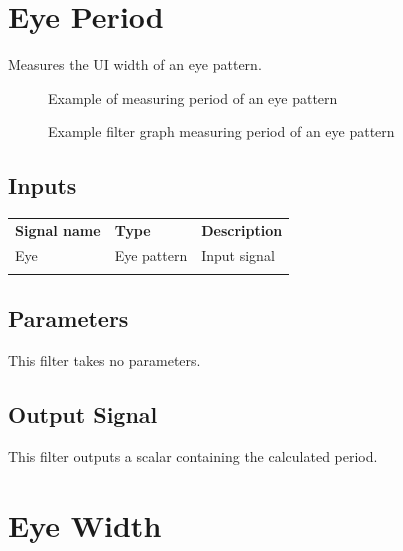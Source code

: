 \pagebreak
\section{Eye Period}
\label{filter:eyeperiod}

Measures the UI width of an eye pattern.

\begin{figure}[h]
\centering
{}
\caption{Example of measuring period of an eye pattern}
\label{filter_eye_period}
\end{figure}

\begin{figure}[h]
\centering
{}
\caption{Example filter graph measuring period of an eye pattern}
\label{filter_graph_eye_period}
\end{figure}
\FloatBarrier

\subsection{Inputs}

\begin{tabularx}{16cm}{llX}
\thickhline
\textbf{Signal name} & \textbf{Type} & \textbf{Description} \\
\thickhline
Eye & Eye pattern & Input signal\\
\thickhline
\end{tabularx}

\subsection{Parameters}

This filter takes no parameters.

\subsection{Output Signal}

This filter outputs a scalar containing the calculated period.

\pagebreak
\section{Eye Width}
\label{filter:eyewidth}

